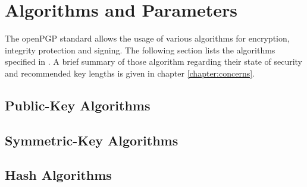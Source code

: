 \section{Algorithms and Parameters}



The openPGP standard allows the usage of various algorithms for encryption, integrity protection and signing. The following section lists the algorithms specified in \citep[section 9]{RFC4880}. A brief summary of those algorithm regarding their state of security and recommended key lengths is given in chapter \ref{chapter:concerns}.

\subsection{Public-Key Algorithms}

\subsection{Symmetric-Key Algorithms}

\subsection{Hash Algorithms}

